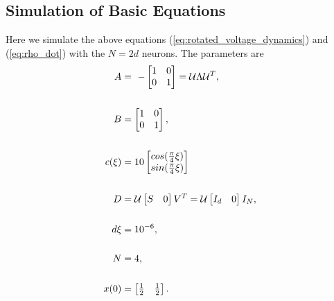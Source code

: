 \subsection{Simulation of Basic Equations}
Here we simulate the above equations (\ref{eq:rotated_voltage_dynamics}) and (\ref{eq:rho_dot}) with the $N = 2d$ neurons. The parameters are
\begin{align}
\label{eq:sim_I_params}
A
&=
\ -\begin{bmatrix}  
1 & 0 \\
0 & 1
\end{bmatrix} = \mathcal{U} \Lambda \mathcal{U}^T \notag,
\\
\notag
\\
B
&=
\begin{bmatrix}  
1 & 0 \\
0 & 1
\end{bmatrix}, \notag 
\\
\notag 
\\
c(\xi) 
&=
10 \begin{bmatrix} 
cos(\frac{\pi}{4} \xi)\\
sin(\frac{\pi}{4} \xi)
\end{bmatrix} 
\\
\notag
\\
D
&=
\mathcal{U} 
\begin{bmatrix}
S & 0
\end{bmatrix}
V^T
=
\mathcal{U} 
\begin{bmatrix}
I_d & 0
\end{bmatrix}
I_N \notag,
\\
\notag 
\\
d\xi 
&= 
10^{-6}, \notag 
\\
\notag 
\\
N 
&= 
4,\notag 
\\
\notag 
\\
x(0) 
&= 
\begin{bmatrix} \frac{1}{2} & \frac{1}{2} \end{bmatrix}.\notag 
\end{align}

